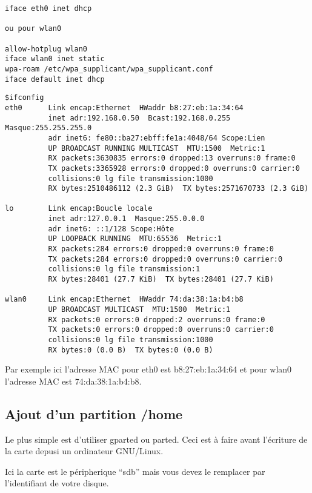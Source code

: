 \begin{verbatim}
iface eth0 inet dhcp

ou pour wlan0

allow-hotplug wlan0
iface wlan0 inet static
wpa-roam /etc/wpa_supplicant/wpa_supplicant.conf
iface default inet dhcp
\end{verbatim}

\begin{verbatim}
$ifconfig
eth0      Link encap:Ethernet  HWaddr b8:27:eb:1a:34:64  
          inet adr:192.168.0.50  Bcast:192.168.0.255  Masque:255.255.255.0
          adr inet6: fe80::ba27:ebff:fe1a:4048/64 Scope:Lien
          UP BROADCAST RUNNING MULTICAST  MTU:1500  Metric:1
          RX packets:3630835 errors:0 dropped:13 overruns:0 frame:0
          TX packets:3365928 errors:0 dropped:0 overruns:0 carrier:0
          collisions:0 lg file transmission:1000 
          RX bytes:2510486112 (2.3 GiB)  TX bytes:2571670733 (2.3 GiB)

lo        Link encap:Boucle locale  
          inet adr:127.0.0.1  Masque:255.0.0.0
          adr inet6: ::1/128 Scope:Hôte
          UP LOOPBACK RUNNING  MTU:65536  Metric:1
          RX packets:284 errors:0 dropped:0 overruns:0 frame:0
          TX packets:284 errors:0 dropped:0 overruns:0 carrier:0
          collisions:0 lg file transmission:1 
          RX bytes:28401 (27.7 KiB)  TX bytes:28401 (27.7 KiB)

wlan0     Link encap:Ethernet  HWaddr 74:da:38:1a:b4:b8  
          UP BROADCAST MULTICAST  MTU:1500  Metric:1
          RX packets:0 errors:0 dropped:2 overruns:0 frame:0
          TX packets:0 errors:0 dropped:0 overruns:0 carrier:0
          collisions:0 lg file transmission:1000 
          RX bytes:0 (0.0 B)  TX bytes:0 (0.0 B)
\end{verbatim}

Par exemple ici l'adresse MAC pour eth0 est b8:27:eb:1a:34:64 et pour wlan0 l'adresse MAC est 74:da:38:1a:b4:b8.

\subsection{Ajout d'un partition /home}

Le plus simple est d'utiliser gparted ou parted. Ceci est à faire avant l'écriture de la carte depusi un ordinateur GNU/Linux.

Ici la carte est le péripherique ``sdb'' mais vous devez le remplacer par l'identifiant de votre disque. 

